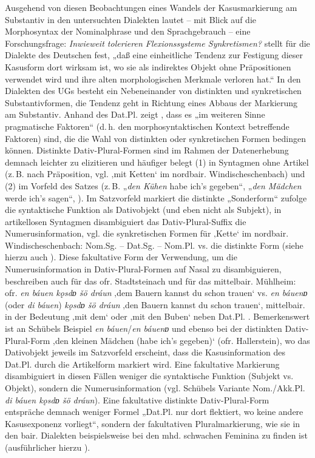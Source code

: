 Ausgehend von diesen Beobachtungen eines Wandels der Kasusmarkierung am Substantiv in den untersuchten Dialekten lautet -- mit Blick auf die Morphosyntax der Nominalphrase und den Sprachgebrauch -- eine Forschungsfrage: \textit{Inwieweit tolerieren Flexionssysteme Synkretismen?} \citet[440]{Schirmunski1962} stellt für die Dialekte des Deutschen fest, „daß eine einheitliche Tendenz zur Festigung dieser Kasusform dort wirksam ist, wo sie als indirektes Objekt ohne Präpositionen verwendet wird und ihre alten morphologischen Merkmale verloren hat.“ In den Dialekten des UGs besteht ein Nebeneinander von distinkten und synkretischen Substantivformen, die Tendenz geht in Richtung eines Abbaus der Markierung am Substantiv. Anhand des Dat.Pl. zeigt \citet[96]{Rowley1997}, dass es „im weiteren Sinne pragmatische Faktoren“ (d.\,h. den morphosyntaktischen Kontext betreffende Faktoren) sind, die die Wahl von distinkten oder synkretischen Formen bedingen können. Distinkte Dativ-Plural-Formen sind im Rahmen der Datenerhebung demnach leichter zu elizitieren und häufiger belegt (1) in Syntagmen ohne Artikel (z.\,B. nach Präposition, vgl.   ‚mit Ketten‘ im nordbair. Windischeschenbach) und (2) im Vorfeld des Satzes (z.\,B. „\textit{den Kühen} habe ich’s gegeben“, „\textit{den Mädchen} werde ich’s sagen“, \citealt[96]{Rowley1997}). Im Satzvorfeld markiert die distinkte „Sonderform“ \citet[96]{Rowley1997} zufolge die syntaktische Funktion als Dativobjekt (und eben nicht als Subjekt), in artikellosen Syntagmen disambiguiert das Dativ-Plural-Suffix die Numerusinformation, vgl. die synkretischen Formen für ‚Kette‘ im nordbair. Windischeschenbach: Nom.Sg.  -- Dat.Sg.   -- Nom.Pl.  vs. die distinkte Form   (siehe hierzu auch ). Diese fakultative Form der Verwendung, um die Numerusinformation in Dativ-Plural-Formen auf Nasal zu disambiguieren, beschreiben auch \citet[§13]{Schübel1955} für das ofr. Stadtsteinach und \citet[§12]{Weitzenböck1942} für das mittelbair. Mühlheim: ofr. \textit{en báuen kǫsdɒ šö dráun} ‚dem Bauern kannst du schon trauen‘ vs. \textit{en báuenɒ} (oder \textit{di báuen}) \textit{kǫsdɒ šö dráun} ‚den Bauern kannst du schon trauen‘, mittelbair.   in der Bedeutung ‚mit dem‘ oder ‚mit den Buben‘ neben Dat.Pl.  . Bemerkenswert ist an Schübels Beispiel \textit{en báuen}/\textit{en báuenɒ} und ebenso bei der distinkten Dativ-Plural-Form    ‚den kleinen Mädchen (habe ich’s gegeben)‘ (ofr. Hallerstein), wo das Dativobjekt jeweils im Satzvorfeld erscheint, dass die Kasusinformation des Dat.Pl. durch die Artikelform markiert wird. Eine fakultative Markierung disambiguiert in diesen Fällen weniger die syntaktische Funktion (Subjekt vs. Objekt), sondern die Numerusinformation (vgl. Schübels Variante Nom./Akk.Pl. \textit{di báuen kǫsdɒ šö dráun}). Eine fakultative distinkte Dativ-Plural-Form entspräche demnach weniger  Formel „Dat.Pl. nur dort flektiert, wo keine andere Kasusexponenz vorliegt“, sondern der fakultativen Pluralmarkierung, wie sie in den bair. Dialekten beispielsweise bei den mhd. schwachen Feminina zu finden ist (ausführlicher hierzu ).

